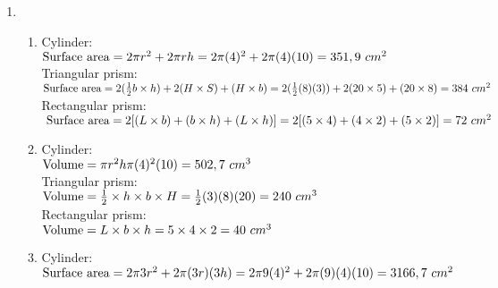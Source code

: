  \begin{eocsolutions}{}{
\begin{enumerate}[itemsep=5pt, label=\textbf{\arabic*}. ] 
\item \begin{enumerate}[itemsep=5pt, label=\textbf{(\alph*)} ]
       \item Cylinder: \\
$\mbox{Surface area} = 2 \pi r^2 + 2 \pi rh \\
= 2 \pi (4)^2 + 2 \pi(4)(10) \\
= 351,9 ~cm^{2}$\\

Triangular prism:  \\
$\mbox{Surface area} = 2(\frac{1}{2}b \times h) + 2(H \times S) + (H \times b)\\
= 2(\frac{1}{2}(8)(3)) + 2(20 \times 5) + (20 \times 8)\\
= 384 ~cm^{2}$\\

Rectangular prism:\\
$\mbox{ Surface area} = 2[(L \times b) + (b \times h) + (L \times h)] \\
= 2[(5 \times 4) + (4 \times 2) + (5 \times 2)] \\
= 72 ~cm^{2}$

\item Cylinder: \\
$\mbox{Volume} = \pi r^2 h \\
\pi (4)^2(10)\\
= 502,7 ~cm^{3}$ \\

Triangular prism:  \\
$\mbox{Volume} = \frac{1}{2} \times h \times b \times H\\
= \frac{1}{2}(3)(8)(20)\\
= 240 ~cm^{3}$ \\

Rectangular prism:\\
$\mbox{Volume} = L \times b \times h\\
= 5 \times 4 \times 2 \\
= 40 ~ cm^{3}$ 

\item Cylinder: \\
$\mbox{Surface area} = 2 \pi 3r^2 + 2 \pi (3r)(3h) \\
= 2 \pi 9(4)^2 + 2 \pi(9)(4)(10) \\
= 3166,7 ~cm^{2}$\\


\end{enumerate}
\end{enumerate}}
\end{eocsolutions}
